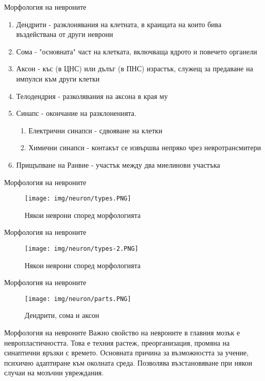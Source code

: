 \begin{frame}[t]{Морфология на невроните}
  \begin{enumerate}
    \item   Дендрити - разклонявания на клетната, в краищата на които бива въздействана от други неврони
    \item   Сома - "основната" част на клетката, включваща ядрото и повечето органели
    \item   Аксон - къс (в ЦНС) или дълъг (в ПНС) израстък, служещ за предаване на импулси към други клетки
    \item   Телодендрия - разколявания на аксона в края му
    \item   Синапс - окончание на разклоненията. 
    \begin{enumerate}
      \item   Електрични синапси - сдвояване на клетки
      \item   Химични синапси - контакът се извършва непряко чрез невротрансмитери
    \end{enumerate}
    \item   Прищъпване на Ранвие - участък между два миелинови участъка
  \end{enumerate}
\end{frame}

\begin{frame}[t]{Морфология на невроните}
  \begin{figure}[htbp!]
    \centering
    \texttt{[image: img/neuron/types.PNG]}
    \caption{Някои неврони според морфологията \cite[Фиг 1.2]{Neuroscience}}
  \end{figure}
\end{frame}

\begin{frame}[t]{Морфология на невроните}
  \begin{figure}[htbp!]
    \centering
    \texttt{[image: img/neuron/types-2.PNG]}
    \caption{Някои неврони според морфологията \cite[Фиг 1.4]{Neuron}}
  \end{figure}
\end{frame}

\begin{frame}[t]{Морфология на невроните}
  \begin{figure}[htbp!]
    \centering
    \texttt{[image: img/neuron/parts.PNG]}
    \caption{Дендрити, сома и аксон \cite[Фиг 1.3]{Neuroscience}}
    \label{figure:usf}
  \end{figure}
\end{frame}

\begin{frame}[t]{Морфология на невроните}
  Важно свойство на невроните в главния мозък е невропластичността.
  Това е техния растеж, преорганизация, промяна на синаптични връзки с времето.
  Основната причина за възможността за учение, психично адаптиране към околната среда.
  Позволява възстановяване при някои случаи на мозъчни увреждания. 
\end{frame}


